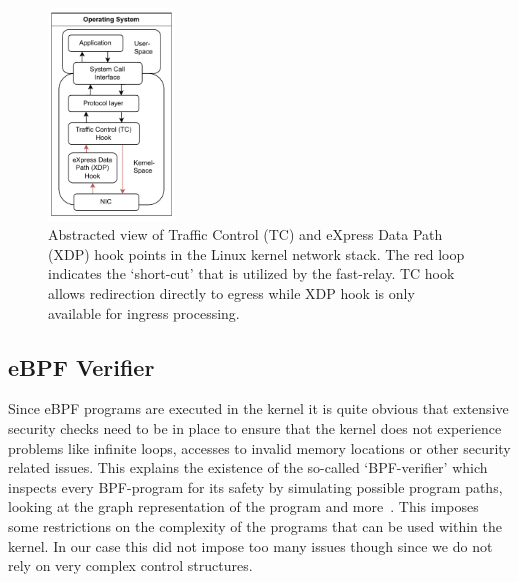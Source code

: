 \begin{figure}[htbp]
    \centering
    \includegraphics[width=0.3\textwidth]{figures/02_background/hook-point-locations.drawio.pdf}
    \caption[Hook points within network stack]{Abstracted view of Traffic Control (TC) and eXpress Data Path (XDP) hook points
    in the Linux kernel network stack.
    The red loop indicates the `short-cut' that is utilized by the fast-relay.
    TC hook allows redirection directly to egress while XDP hook is only available
    for ingress processing.
    }\label{fig:ebpf-hooks}
\end{figure}


\subsection{eBPF Verifier}
Since eBPF programs are executed in the kernel it is quite obvious that extensive
security checks need to be in place to ensure that the kernel does not experience 
problems like infinite loops, accesses to invalid memory locations or other security 
related issues.
This explains the existence of the so-called `BPF-verifier' which inspects 
every BPF-program for its safety by simulating possible program paths, 
looking at the graph representation of the program and more~\parencite{ebpf-verifier}.
This imposes some restrictions on the complexity of the programs that can be 
used within the kernel.
In our case this did not impose too many issues though since we do not rely on 
very complex control structures.

